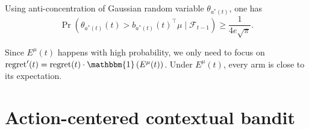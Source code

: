 \documentclass[letterpaper,11pt]{article}
\begin{document}
Using anti-concentration of Gaussian random variable $\theta_{a^*(t)}$, one has 
$$
\Pr\left(\theta_{a^*(t)}(t)>b_{a^*(t)}(t)^\top \mu \mid \mathcal{F}_{t-1}\right) \geq \frac{1}{4e\sqrt{\pi}}. 
$$


Since $E^{\mu}(t)$ happens with high probability, we only need to focus on $\operatorname{regret}^{\prime}(t)=\operatorname{regret}(t) \cdot \mathbbm{1}\left(E^\mu(t)\right)$. 
Under $E^\mu(t)$, every arm is close to its expectation. 













\section{Action-centered contextual bandit}
\end{document}

